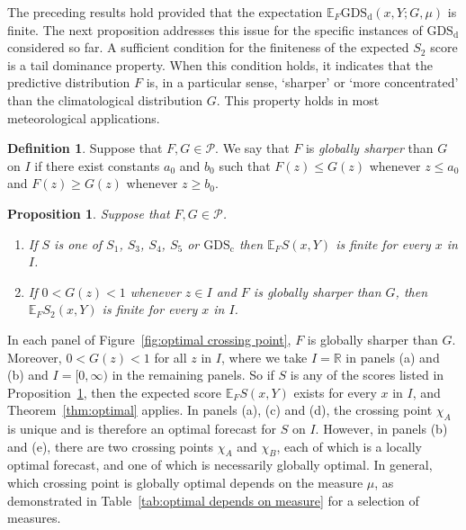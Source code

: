 \documentclass[10pt]{article} %
\theoremstyle{theorem}
\newtheorem{prop}{Proposition}
\theoremstyle{definition}
\newtheorem{defn}{Definition}
\newcommand{\RRR}{\mathbb{R}}
\newcommand{\EEE}{\mathbb{E}}
\newcommand{\GDSd}{\mathrm{GDS}_\mathrm{d}}
\newcommand{\GDSc}{\mathrm{GDS}_\mathrm{c}}
\begin{document}
The preceding results hold provided that the expectation $\EEE_F \GDSd(x,Y;G,\mu)$ is finite. The next proposition addresses this issue for the specific instances of $\GDSd$ considered so far. A sufficient condition for the finiteness of the expected $S_2$ score is a tail dominance property. When this condition holds, it indicates that the predictive distribution $F$ is, in a particular sense, `sharper' or `more concentrated' than the climatological distribution $G$. This property holds in most meteorological applications.

\begin{defn}\label{def:global sharp}
Suppose that $F,G\in\mathcal{P}$. We say that $F$ is \textit{globally sharper} than $G$ on $I$ if there exist constants $a_0$ and $b_0$ such that $F(z)\leq G(z)$ whenever $z\leq a_0$ and $F(z)\geq G(z)$ whenever $z\geq b_0$.
\end{defn}

\begin{prop}\label{prop:optimal fcst}
Suppose that $F, G \in\mathcal{P}$.
\begin{enumerate}
\item[(i)] If $S$ is one of $S_1$, $S_3$, $S_4$, $S_5$ or $\GDSc$ then $\EEE_F S(x,Y)$ is finite for every $x$ in $I$.
\item[(ii)] If $0<G(z)<1$ whenever $z\in I$ and $F$ is globally sharper than $G$, then $\EEE_F S_2(x,Y)$ is finite for every $x$ in $I$.
\end{enumerate}
\end{prop}

In each panel of Figure~\ref{fig:optimal crossing point}, $F$ is globally sharper than $G$. Moreover, $0<G(z)<1$ for all $z$ in $I$, where we take $I=\RRR$ in panels (a) and (b) and $I=[0,\infty)$ in the remaining panels. So if $S$ is any of the scores listed in Proposition~\ref{prop:optimal fcst}, then the expected score $\EEE_F S(x,Y)$ exists for every $x$ in $I$, and Theorem~\ref{thm:optimal} applies. In panels (a), (c) and (d), the crossing point $\chi_A$ is unique and is therefore an optimal forecast for $S$ on $I$. However, in panels (b) and (e), there are two crossing points $\chi_A$ and $\chi_B$, each of which is a locally optimal forecast, and one of which is necessarily globally optimal.  In general, which crossing point is globally optimal depends on the measure $\mu$, as demonstrated in Table~\ref{tab:optimal depends on measure} for a selection of measures.
\end{document}

